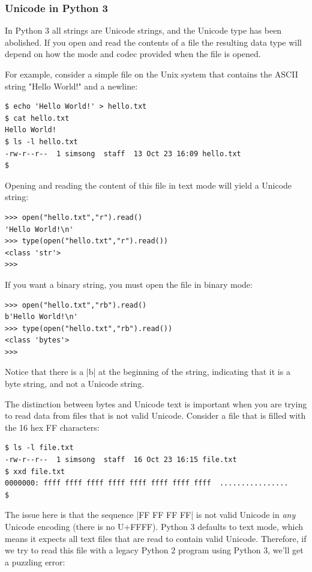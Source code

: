 \subsubsection{Unicode in Python 3}
In Python 3 all strings are  Unicode strings, and the Unicode type has been abolished.  If you open and read the contents of a file the resulting data type will depend on how the mode and codec provided when the file is opened.

For example, consider a simple file on the Unix system that contains the ASCII string "Hello World!" and a newline:

\begin{Verbatim}
$ echo 'Hello World!' > hello.txt
$ cat hello.txt
Hello World!
$ ls -l hello.txt
-rw-r--r--  1 simsong  staff  13 Oct 23 16:09 hello.txt
$ 
\end{Verbatim}

Opening and reading the content of this file in text mode will yield a Unicode string:
\begin{Verbatim}
>>> open("hello.txt","r").read()
'Hello World!\n'
>>> type(open("hello.txt","r").read())
<class 'str'>
>>> 
\end{Verbatim}

If you want a binary string, you must open the file in binary mode:

\begin{Verbatim}
>>> open("hello.txt","rb").read()
b'Hello World!\n'
>>> type(open("hello.txt","rb").read())
<class 'bytes'>
>>> 
\end{Verbatim}

Notice that there is a |b| at the beginning of the string, indicating that it is a byte string, and not a Unicode string.

The distinction between bytes and Unicode text is important when you are trying to read data from files that is not valid Unicode. Consider a file that is filled with the 16 hex FF characters:

\begin{Verbatim}
$ ls -l file.txt 
-rw-r--r--  1 simsong  staff  16 Oct 23 16:15 file.txt
$ xxd file.txt 
0000000: ffff ffff ffff ffff ffff ffff ffff ffff  ................
$ 
\end{Verbatim}
The issue here is that the sequence |FF FF FF FF| is not valid Unicode
in \emph{any} Unicode encoding (there is no U+FFFF). Python 3 defaults
to text mode, which means it expects all text files that are read to contain valid Unicode. Therefore, if we try to read this file with a legacy Python 2 program using Python 3, we'll get a puzzling error:

